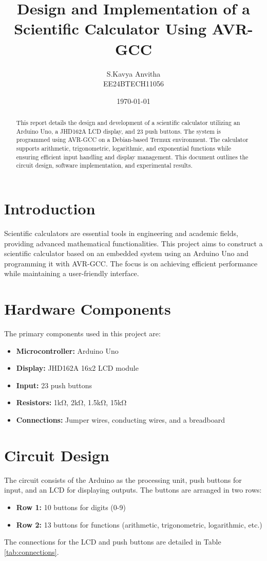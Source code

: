 \documentclass[12pt,a4paper]{article}
\title{\textbf{Design and Implementation of a Scientific Calculator Using AVR-GCC}}
\author{S.Kavya Anvitha \\EE24BTECH11056}
\date{\today}
\begin{document}
\maketitle

\begin{abstract}
This report details the design and development of a scientific calculator utilizing an Arduino Uno, a JHD162A LCD display, and 23 push buttons. The system is programmed using AVR-GCC on a Debian-based Termux environment. The calculator supports arithmetic, trigonometric, logarithmic, and exponential functions while ensuring efficient input handling and display management. This document outlines the circuit design, software implementation, and experimental results.
\end{abstract}

\section{Introduction}
Scientific calculators are essential tools in engineering and academic fields, providing advanced mathematical functionalities. This project aims to construct a scientific calculator based on an embedded system using an Arduino Uno and programming it with AVR-GCC. The focus is on achieving efficient performance while maintaining a user-friendly interface.

\section{Hardware Components}
The primary components used in this project are:
\begin{itemize}
    \item \textbf{Microcontroller:} Arduino Uno
    \item \textbf{Display:} JHD162A 16x2 LCD module
    \item \textbf{Input:} 23 push buttons
    \item \textbf{Resistors:} 1k\si{\ohm}, 2k\si{\ohm}, 1.5k\si{\ohm}, 15k\si{\ohm}
    \item \textbf{Connections:} Jumper wires, conducting wires, and a breadboard
\end{itemize}

\section{Circuit Design}
The circuit consists of the Arduino as the processing unit, push buttons for input, and an LCD for displaying outputs. The buttons are arranged in two rows:
\begin{itemize}
    \item \textbf{Row 1:} 10 buttons for digits (0-9)
    \item \textbf{Row 2:} 13 buttons for functions (arithmetic, trigonometric, logarithmic, etc.)
\end{itemize}
The connections for the LCD and push buttons are detailed in Table \ref{tab:connections}.
\end{document}
